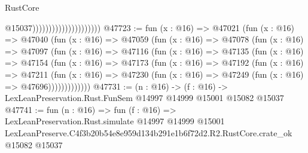 \begin{lexlean}{RustCore}
\begin{coremodule}
                                              @15037)))))))))))))))))))))
@47723 := fun (x : @16) =>
  @47021
    (fun (x : @16) =>
    @47040
      (fun (x : @16) =>
      @47059
        (fun (x : @16) =>
        @47078
          (fun (x : @16) =>
          @47097
            (fun (x : @16) =>
            @47116
              (fun (x : @16) =>
              @47135
                (fun (x : @16) =>
                @47154
                  (fun (x : @16) =>
                  @47173
                    (fun (x : @16) =>
                    @47192
                      (fun (x : @16) =>
                      @47211
                        (fun (x : @16) =>
                        @47230 (fun (x : @16) => @47249 (fun (x : @16) => @47696)))))))))))))
@47731 := (n : @16) ->
  (f : @16) -> LexLeanPreservation.Rust.FunSem @14997 @14999 @15001 @15082 @15037
@47741 := fun (n : @16) =>
  fun (f : @16) =>
  LexLeanPreservation.Rust.simulate
    @14997
    @14999
    @15001
    LexLeanPreserve.C4f3b20b54e8e959d134b291e1b6f72d2.R2.RustCore.crate_ok
    @15082
    @15037
\end{coremodule}
\end{lexlean}
